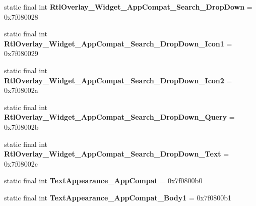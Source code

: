 \begin{DoxyCompactItemize}
\item 
\hypertarget{classandroid_1_1support_1_1design_1_1_r_1_1style_ad641028a3298caa7cb319dba54de145d}{}static final int {\bfseries Rtl\+Overlay\+\_\+\+Widget\+\_\+\+App\+Compat\+\_\+\+Search\+\_\+\+Drop\+Down} = 0x7f080028\label{classandroid_1_1support_1_1design_1_1_r_1_1style_ad641028a3298caa7cb319dba54de145d}

\item 
\hypertarget{classandroid_1_1support_1_1design_1_1_r_1_1style_ade60ca91c16982eaf6b75694ed4f86c2}{}static final int {\bfseries Rtl\+Overlay\+\_\+\+Widget\+\_\+\+App\+Compat\+\_\+\+Search\+\_\+\+Drop\+Down\+\_\+\+Icon1} = 0x7f080029\label{classandroid_1_1support_1_1design_1_1_r_1_1style_ade60ca91c16982eaf6b75694ed4f86c2}

\item 
\hypertarget{classandroid_1_1support_1_1design_1_1_r_1_1style_a33f59a8fbfa51417eb810c8f3ea703d3}{}static final int {\bfseries Rtl\+Overlay\+\_\+\+Widget\+\_\+\+App\+Compat\+\_\+\+Search\+\_\+\+Drop\+Down\+\_\+\+Icon2} = 0x7f08002a\label{classandroid_1_1support_1_1design_1_1_r_1_1style_a33f59a8fbfa51417eb810c8f3ea703d3}

\item 
\hypertarget{classandroid_1_1support_1_1design_1_1_r_1_1style_af5d79a9f7bda95a6bb733e4e50aeae28}{}static final int {\bfseries Rtl\+Overlay\+\_\+\+Widget\+\_\+\+App\+Compat\+\_\+\+Search\+\_\+\+Drop\+Down\+\_\+\+Query} = 0x7f08002b\label{classandroid_1_1support_1_1design_1_1_r_1_1style_af5d79a9f7bda95a6bb733e4e50aeae28}

\item 
\hypertarget{classandroid_1_1support_1_1design_1_1_r_1_1style_a09f6359f265a6b5412de4226637340cb}{}static final int {\bfseries Rtl\+Overlay\+\_\+\+Widget\+\_\+\+App\+Compat\+\_\+\+Search\+\_\+\+Drop\+Down\+\_\+\+Text} = 0x7f08002c\label{classandroid_1_1support_1_1design_1_1_r_1_1style_a09f6359f265a6b5412de4226637340cb}

\item 
\hypertarget{classandroid_1_1support_1_1design_1_1_r_1_1style_a150f94913f3a6732ce3ba8a8afdd1e3a}{}static final int {\bfseries Text\+Appearance\+\_\+\+App\+Compat} = 0x7f0800b0\label{classandroid_1_1support_1_1design_1_1_r_1_1style_a150f94913f3a6732ce3ba8a8afdd1e3a}

\item 
\hypertarget{classandroid_1_1support_1_1design_1_1_r_1_1style_a8ed35c1c1c7ff1e4555efdd939993b32}{}static final int {\bfseries Text\+Appearance\+\_\+\+App\+Compat\+\_\+\+Body1} = 0x7f0800b1\label{classandroid_1_1support_1_1design_1_1_r_1_1style_a8ed35c1c1c7ff1e4555efdd939993b32}


\end{DoxyCompactItemize}
